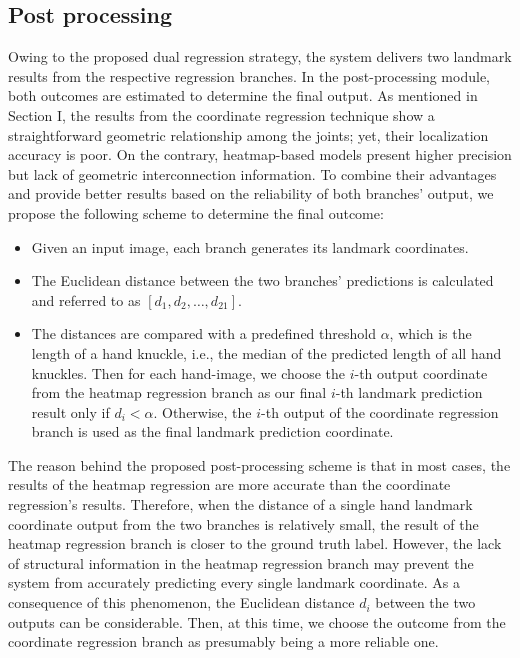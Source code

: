 \documentclass[11pt]{article}
\begin{document}
\subsection{Post processing}
Owing to the proposed dual regression strategy, the system delivers two landmark results from the respective regression branches. In the post-processing module, both outcomes are estimated to determine the final output. As mentioned in Section I, the results from the coordinate regression technique show a straightforward geometric relationship among the joints; yet, their localization accuracy is poor. On the contrary, heatmap-based models present higher precision but lack of geometric interconnection information. To combine their advantages and provide better results based on the reliability of both branches’ output, we propose the following scheme to determine the final outcome:
\begin{itemize}[leftmargin=1.25em]
\item Given an input image, each branch generates its landmark coordinates.
\item The Euclidean distance between the two branches’ predictions is calculated and referred to as $[d_{1}, d_{2}, \ldots, d_{21}]$.
\item The distances are compared with a predefined threshold $\alpha$, which is the length of a hand knuckle, i.e., the median of the predicted length of all hand knuckles. Then for each hand-image, we choose the $i$-th output coordinate from the heatmap regression branch as our final $i$-th landmark prediction result only if $d_{i} < \alpha$. Otherwise, the $i$-th output of the coordinate regression branch is used as the final landmark prediction coordinate.
\end{itemize}
The reason behind the proposed post-processing scheme is that in most cases, the results of the heatmap regression are more accurate than the coordinate regression’s results. Therefore, when the distance of a single hand landmark coordinate output from the two branches is relatively small, the result of the heatmap regression branch is closer to the ground truth label. However, the lack of structural information in the heatmap regression branch may prevent the system from accurately predicting every single landmark coordinate. As a consequence of this phenomenon, the Euclidean distance $d_{i}$ between the two outputs can be considerable. Then, at this time, we choose the outcome from the coordinate regression branch as presumably being a more reliable one.
\end{document}
